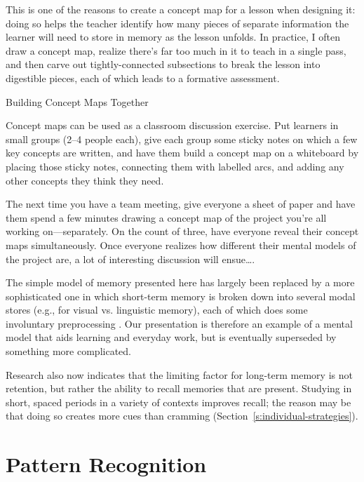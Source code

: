 This is one of the reasons to create a concept map for a lesson when
designing it: doing so helps the teacher identify how many pieces of
separate information the learner will need to store in memory as the
lesson unfolds. In practice, I often draw a concept map, realize there's
far too much in it to teach in a single pass, and then carve out
tightly-connected subsections to break the lesson into digestible
pieces, each of which leads to a formative assessment.

\begin{aside}{Building Concept Maps Together}

Concept maps can be used as a classroom discussion exercise. Put
learners in small groups (2--4 people each), give each group some
sticky notes on which a few key concepts are written, and have them
build a concept map on a whiteboard by placing those sticky notes,
connecting them with labelled arcs, and adding any other concepts they
think they need.

The next time you have a team meeting, give everyone a sheet of paper
and have them spend a few minutes drawing a concept map of the project
you're all working on---separately. On the count of three, have everyone
reveal their concept maps simultaneously. Once everyone realizes how
different their mental models of the project are, a lot of interesting
discussion will ensue{\ldots}.

\end{aside}

The simple model of memory presented here has largely been replaced by a
more sophisticated one in which short-term memory is broken down into
several modal stores (e.g., for visual vs. linguistic memory), each of
which does some involuntary preprocessing \cite{Mill2016a}. Our
presentation is therefore an example of a mental model that aids
learning and everyday work, but is eventually superseded by something
more complicated.

Research also now indicates that the limiting factor for long-term
memory is not retention, but rather the ability to recall memories that
are present. Studying in short, spaced periods in a variety of contexts
improves recall; the reason may be that doing so creates more cues than
cramming (Section~\ref{s:individual-strategies}).

\section{Pattern Recognition}\label{s:memory-pattern}


